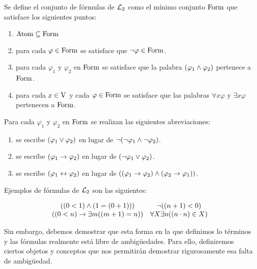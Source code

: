 \begin{definition}[Fórmulas]
	Se define el conjunto de fórmulas de $\ARITMETICA$ como el mínimo conjunto $\FORMULAS$ que satisface los siguientes puntos:

	\begin{enumerate}
		\item $\ATOMICAS\subseteq\FORMULAS$
		\item para cada $\varphi\in\FORMULAS$ se satisface que $\neg\varphi\in\FORMULAS$.
		\item para cada $\varphi_{1}$ y $\varphi_{2}$ en $\FORMULAS$ se satisface que la palabra $\pa*{\varphi_{1}\land\varphi_{2}}$ pertenece a $\FORMULAS$.
		\item para cada $x\in\VARIABLES$ y cada $\varphi\in\FORMULAS$ se satisface que las palabras $\forall x\varphi$ y $\exists x\varphi$ pertenecen a $\FORMULAS$.
	\end{enumerate}
\end{definition}

\begin{notation}
	Para cada $\varphi_{1}$ y $\varphi_{2}$ en $\FORMULAS$ se realizan las siguientes abreviaciones:

	\begin{enumerate}
		\item se escribe $\pa*{\varphi_{1}\vee\varphi_{2}}$ en lugar de $\neg\pa*{\neg\varphi_{1}\land\neg\varphi_{2}}$.
		\item se escribe $\pa*{\varphi_{1}\to\varphi_{2}}$ en lugar de $\pa*{\neg\varphi_{1}\vee\varphi_{2}}$.
		\item se escribe $\pa*{\varphi_{1}\leftrightarrow\varphi_{2}}$ en lugar de $\pa*{\pa*{\varphi_{1}\to\varphi_{2}}\land\pa*{\varphi_{2}\to\varphi_{1}}}$.
	\end{enumerate}
\end{notation}

Ejemplos de fórmulas de $\ARITMETICA$ son las siguientes:

\[
	\begin{array}{cc}
		\pa*{\pa*{0 < 1}\land\pa*{1 =\pa*{0 + 1}}} &\neg\pa*{\pa*{n + 1} < 0}\\
		\pa*{\pa*{0 < n}\to\exists m\pa*{\pa*{m + 1} = n}} &\forall X\exists n\pa*{\pa*{n\cdot n}\in X}
	\end{array}
\]

Sin embargo, debemos demostrar que esta forma en la que definimos lo términos y las fórmulas realmente está libre de ambigüedades. Para ello, definiremos ciertos objetos y conceptos que nos permitirán demostrar rigurosamente esa falta de ambigüedad.

